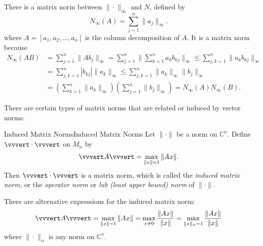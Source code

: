 \documentclass[../main.tex]{subfiles}
\begin{document}
There is a matrix norm between $\| \cdot \|_\infty$ and $N$, defined by
\begin{equation*}
  N_\infty(A) = \sum_{j=1}^n \|a_j\|_\infty.
\end{equation*}
where $A = [a_1, a_2, \ldots, a_n]$ is the column decomposition of $A$. It is a matrix norm because
\begin{equation*}
  \begin{aligned}
    N_\infty(AB) & = \sum_{j=1}^n \|A b_j\|_\infty = \sum_{j=1}^n \|\sum_{k=1}^n a_k b_{kj}\|_\infty \leq \sum_{j,k=1}^n \|a_k b_{kj}\|_\infty \\
    &= \sum_{j,k=1}^n |b_{kj}| \|a_k\|_\infty \leq \sum_{j,k=1}^n \|a_k\|_\infty \|b_j\|_\infty\\
    &= \left( \sum_{k=1}^n \|a_k\|_\infty \right) \left( \sum_{j=1}^n \|b_j\|_\infty \right) = N_\infty(A) N_\infty(B).
  \end{aligned}
\end{equation*}

There are certain types of matrix norms that are related or induced by vector norms:
\begin{definition}{Induced Matrix Norms}{Induced Matrix Norms}
  Let $\|\cdot\|$ be a norm on $\mathbb{C}^n$. Define $\vvvert \cdot \vvvert$ on $M_n$ by
  \begin{equation}
  \vvvert A \vvvert = \max_{\|x\| = 1} \|A x\|.
  \end{equation}
  Then $\vvvert \cdot \vvvert$ is a matrix norm, which is called the \textit{induced matrix norm}, or the \textit{operator norm} or \textit{lub (least upper bound) norm} of $\|\cdot\|$.
\end{definition}
There are alternative expressions for the induced matrix norm:
\begin{equation*}
  \vvvert A \vvvert = \max_{\|x\| = 1} \|A x\| = \max_{x \neq 0} \frac{\|A x\|}{\|x\|} = \max_{\|x\|_{\alpha} = 1} \frac{\|A x\|}{\|x\|}
\end{equation*}
where $\|\cdot\|_{\alpha}$ is any norm on $\mathbb{C}^n$.
\end{document}
